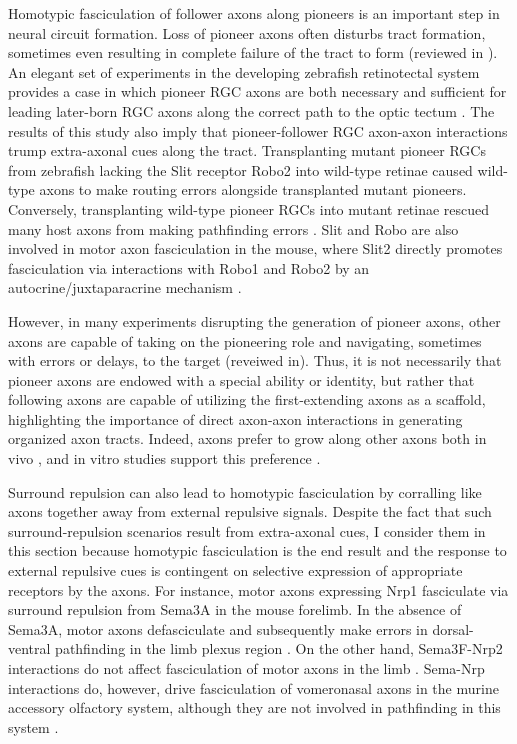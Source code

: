 Homotypic fasciculation of follower axons along pioneers is an important step in neural circuit formation.
Loss of pioneer axons often disturbs tract formation, sometimes even resulting in complete failure of the tract to form (reviewed in ).
An elegant set of experiments in the developing zebrafish retinotectal system provides a case in which pioneer RGC axons are both necessary and sufficient for leading later-born RGC axons along the correct path to the optic tectum \cite{pittman2008pathfinding}.
The results of this study also imply that pioneer-follower RGC axon-axon interactions trump extra-axonal cues along the tract.
Transplanting mutant pioneer RGCs from zebrafish lacking the Slit receptor Robo2 into wild-type retinae caused wild-type axons to make routing errors alongside transplanted mutant pioneers.
Conversely, transplanting wild-type pioneer RGCs into mutant retinae rescued many host axons from making pathfinding errors \cite{pittman2008pathfinding}.
Slit and Robo are also involved in motor axon fasciculation in the mouse, where Slit2 directly promotes fasciculation via interactions with Robo1 and Robo2 by an autocrine/juxtaparacrine mechanism \cite{jaworski2012autocrine}.

However, in many experiments disrupting the generation of pioneer axons, other axons are capable of taking on the pioneering role and navigating, sometimes with errors or delays, to the target (reveiwed in).
Thus, it is not necessarily that pioneer axons are endowed with a special ability or identity, but rather that following axons are capable of utilizing the first-extending axons as a scaffold, highlighting the importance of direct axon-axon interactions in generating organized axon tracts.
Indeed, axons prefer to grow along other axons both in vivo \cite{raper1983pathfinding,tosney1985development}, and in vitro studies support this preference \cite{bonhoeffer1985position}.

Surround repulsion can also lead to homotypic fasciculation by corralling like axons together away from external repulsive signals.
Despite the fact that such surround-repulsion scenarios result from extra-axonal cues, I consider them in this section because homotypic fasciculation is the end result and the response to external repulsive cues is contingent on selective expression of appropriate receptors by the axons.
For instance, motor axons expressing Nrp1 fasciculate via surround repulsion from Sema3A in the mouse forelimb.
In the absence of Sema3A, motor axons defasciculate and subsequently make errors in dorsal-ventral pathfinding in the limb plexus region \cite{huber2005distinct}.
On the other hand, Sema3F-Nrp2 interactions do not affect fasciculation of motor axons in the limb \cite{huber2005distinct}.
Sema-Nrp interactions do, however, drive fasciculation of vomeronasal axons in the murine accessory olfactory system, although they are not involved in pathfinding in this system \cite{cloutier2002neuropilin}.

